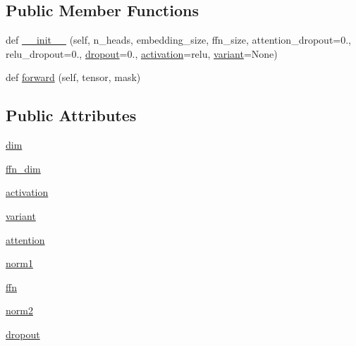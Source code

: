 \subsection*{Public Member Functions}
\begin{DoxyCompactItemize}
\item 
def \hyperlink{classparlai_1_1agents_1_1transformer_1_1modules_1_1TransformerEncoderLayer_a68caa3f119bfb946e34b7cf3c8bd9e48}{\+\_\+\+\_\+init\+\_\+\+\_\+} (self, n\+\_\+heads, embedding\+\_\+size, ffn\+\_\+size, attention\+\_\+dropout=0., relu\+\_\+dropout=0., \hyperlink{classparlai_1_1agents_1_1transformer_1_1modules_1_1TransformerEncoderLayer_a3bcd00a8073a48b6a1626fccb87be143}{dropout}=0., \hyperlink{classparlai_1_1agents_1_1transformer_1_1modules_1_1TransformerEncoderLayer_a2986c3841832cc56d76908347f22a0a3}{activation}=\textquotesingle{}relu\textquotesingle{}, \hyperlink{classparlai_1_1agents_1_1transformer_1_1modules_1_1TransformerEncoderLayer_a33ff5864b155499ecf8d31383b33e8d8}{variant}=None)
\item 
def \hyperlink{classparlai_1_1agents_1_1transformer_1_1modules_1_1TransformerEncoderLayer_aba0474eb3a08b6c482648adc0804776e}{forward} (self, tensor, mask)
\end{DoxyCompactItemize}
\subsection*{Public Attributes}
\begin{DoxyCompactItemize}
\item 
\hyperlink{classparlai_1_1agents_1_1transformer_1_1modules_1_1TransformerEncoderLayer_ae0f31a52dac8d678fdf6ba573201e7d7}{dim}
\item 
\hyperlink{classparlai_1_1agents_1_1transformer_1_1modules_1_1TransformerEncoderLayer_abcdb8b9abb049afacdd132d2a811faff}{ffn\+\_\+dim}
\item 
\hyperlink{classparlai_1_1agents_1_1transformer_1_1modules_1_1TransformerEncoderLayer_a2986c3841832cc56d76908347f22a0a3}{activation}
\item 
\hyperlink{classparlai_1_1agents_1_1transformer_1_1modules_1_1TransformerEncoderLayer_a33ff5864b155499ecf8d31383b33e8d8}{variant}
\item 
\hyperlink{classparlai_1_1agents_1_1transformer_1_1modules_1_1TransformerEncoderLayer_ad8b0a3b903ca2595e72dd54f82f4dd9f}{attention}
\item 
\hyperlink{classparlai_1_1agents_1_1transformer_1_1modules_1_1TransformerEncoderLayer_a74730602aaea5afd4564d0f35c84af15}{norm1}
\item 
\hyperlink{classparlai_1_1agents_1_1transformer_1_1modules_1_1TransformerEncoderLayer_a2f40ac67a332293a3f51eb11647e2ec1}{ffn}
\item 
\hyperlink{classparlai_1_1agents_1_1transformer_1_1modules_1_1TransformerEncoderLayer_acc0beb3a5c95f3ab45b13dff322e4225}{norm2}
\item 
\hyperlink{classparlai_1_1agents_1_1transformer_1_1modules_1_1TransformerEncoderLayer_a3bcd00a8073a48b6a1626fccb87be143}{dropout}
\end{DoxyCompactItemize}


